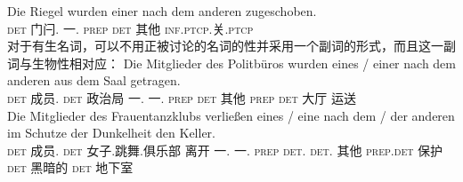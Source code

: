 \ex 
\gll Die Riegel wurden einer nach dem anderen zugeschoben.\\
	 \textsc{det} 门闩.\mas{} \passivepst{} 一.\mas{} \textsc{prep} \textsc{det} 其他 \textsc{inf}.\textsc{ptcp}.关.\textsc{ptcp}\\
\zl
对于有生名词，可以不用正被讨论的名词的性并采用一个副词的形式，而且这一副词与生物性相对应：
\eal
\ex 
\gll Die Mitglieder des Politbüros wurden eines / einer nach dem anderen aus dem Saal getragen.\\
	 \textsc{det} 成员.\neu{} \textsc{det} 政治局 \passivepst{} 一.\neu{} {} 一.\mas{} \textsc{prep} \textsc{det} 其他 \textsc{prep} \textsc{det} 大厅 运送\\
\ex 
\gll Die Mitglieder des Frauentanzklubs verließen eines / eine nach dem / der anderen im Schutze der Dunkelheit den
Keller.\\
\textsc{det} 成员.\neu{} \textsc{det} 女子.跳舞.俱乐部 离开 一.\neu{} {} 一.\fem{} \textsc{prep} \textsc{det}.\neu{} {} \textsc{det}.\fem{} 其他 \textsc{prep}.\textsc{det} 保护 \textsc{det} 黑暗的 \textsc{det}
地下室\\

